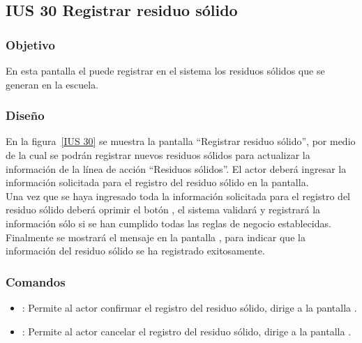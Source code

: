 \subsection{IUS 30 Registrar residuo sólido}

\subsubsection{Objetivo}

      En esta pantalla el  puede registrar en el sistema los residuos sólidos que se generan en la escuela.

\subsubsection{Diseño}

    En la figura~\ref{IUS 30} se muestra la pantalla ``Registrar residuo sólido'', por medio de la cual se podrán registrar nuevos residuos sólidos para actualizar la información de la línea de acción ``Residuos sólidos''. El actor deberá ingresar la información solicitada para el registro del residuo sólido en la pantalla.\\
        
    Una vez que se haya ingresado toda la información solicitada para el registro del residuo sólido deberá oprimir el botón , el sistema validará y registrará la información sólo si se han cumplido todas las reglas de negocio establecidas.\\
    
    Finalmente se mostrará el mensaje  en la pantalla , para indicar que la información del residuo sólido se ha registrado exitosamente.
      
    



\subsubsection{Comandos}
    \begin{itemize}
	\item {}: Permite al actor confirmar el registro del residuo sólido, dirige a la pantalla .
	\item {}: Permite al actor cancelar el registro del residuo sólido, dirige a la pantalla .
    \end{itemize}

